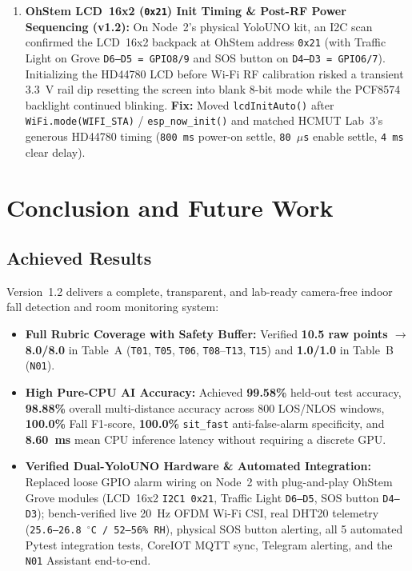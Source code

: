 \documentclass{hcmut-report}
\begin{document}
\begin{enumerate}
  \item \textbf{OhStem LCD~16x2 (\texttt{0x21}) Init Timing \& Post-RF Power Sequencing (v1.2):} On Node~2's physical YoloUNO kit, an I2C scan confirmed the LCD~16x2 backpack at OhStem address \texttt{0x21} (with Traffic Light on Grove \texttt{D6--D5 = GPIO8/9} and SOS button on \texttt{D4--D3 = GPIO6/7}). Initializing the HD44780 LCD before Wi-Fi RF calibration risked a transient 3.3~V rail dip resetting the screen into blank 8-bit mode while the PCF8574 backlight continued blinking. \textbf{Fix:} Moved \texttt{lcdInitAuto()} after \texttt{WiFi.mode(WIFI\_STA)} / \texttt{esp\_now\_init()} and matched HCMUT Lab~3's generous HD44780 timing (\texttt{800~ms} power-on settle, \texttt{80~$\mu$s} enable settle, \texttt{4~ms} clear delay).
\end{enumerate}

\section{Conclusion and Future Work}

\subsection{Achieved Results}
Version~1.2 delivers a complete, transparent, and lab-ready camera-free indoor fall detection and room monitoring system:
\begin{itemize}
  \item \textbf{Full Rubric Coverage with Safety Buffer:} Verified \textbf{10.5 raw points $\rightarrow$ 8.0/8.0} in Table~A (\texttt{T01}, \texttt{T05}, \texttt{T06}, \texttt{T08}--\texttt{T13}, \texttt{T15}) and \textbf{1.0/1.0} in Table~B (\texttt{N01}).
  \item \textbf{High Pure-CPU AI Accuracy:} Achieved \textbf{99.58\%} held-out test accuracy, \textbf{98.88\%} overall multi-distance accuracy across 800 LOS/NLOS windows, \textbf{100.0\%} Fall F1-score, \textbf{100.0\%} \texttt{sit\_fast} anti-false-alarm specificity, and \textbf{8.60~ms} mean CPU inference latency without requiring a discrete GPU.
  \item \textbf{Verified Dual-YoloUNO Hardware \& Automated Integration:} Replaced loose GPIO alarm wiring on Node~2 with plug-and-play OhStem Grove modules (LCD~16x2 \texttt{I2C1 0x21}, Traffic Light \texttt{D6--D5}, SOS button \texttt{D4--D3}); bench-verified live 20~Hz OFDM Wi-Fi CSI, real DHT20 telemetry (\texttt{25.6--26.8~$^\circ$C / 52--56\%~RH}), physical SOS button alerting, all 5 automated Pytest integration tests, CoreIOT MQTT sync, Telegram alerting, and the \texttt{N01} Assistant end-to-end.
\end{itemize}
\end{document}
